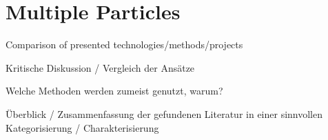 \chapter{Multiple Particles}
\label{ch:discussion}

Comparison of presented technologies/methods/projects

Kritische Diskussion / Vergleich der Ansätze

Welche Methoden werden zumeist genutzt, warum?

Überblick / Zusammenfassung der gefundenen Literatur in einer sinnvollen Kategorisierung / Charakterisierung
